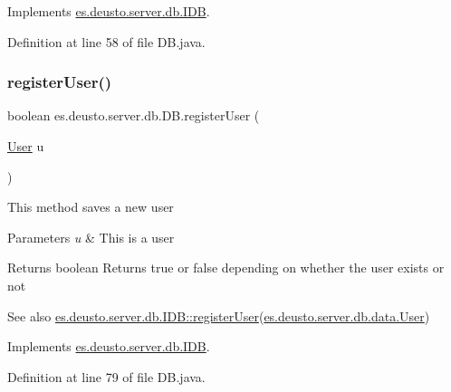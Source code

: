 Implements \hyperlink{interfacees_1_1deusto_1_1server_1_1db_1_1_i_d_b_a6e6196e5899fc93134223373ed8363a6}{es.\+deusto.\+server.\+db.\+I\+DB}.



Definition at line 58 of file D\+B.\+java.

\mbox{\label{classes_1_1deusto_1_1server_1_1db_1_1_d_b_a888f468b3fc2a05520fca9ac135823e3}} 
\subsubsection{\texorpdfstring{register\+User()}{registerUser()}}
{\footnotesize\ttfamily boolean es.\+deusto.\+server.\+db.\+D\+B.\+register\+User (\begin{DoxyParamCaption}\item[{\hyperlink{classes_1_1deusto_1_1server_1_1db_1_1data_1_1_user}{User}}]{u }\end{DoxyParamCaption})}

This method saves a new user 
\begin{DoxyParams}{Parameters}
{\em u} & This is a user \\
\hline
\end{DoxyParams}
\begin{DoxyReturn}{Returns}
boolean Returns true or false depending on whether the user exists or not 
\end{DoxyReturn}
\begin{DoxySeeAlso}{See also}
\hyperlink{interfacees_1_1deusto_1_1server_1_1db_1_1_i_d_b_ad9ecf628cb97ade7cb1b10fd1b3a18c4}{es.\+deusto.\+server.\+db.\+I\+D\+B\+::register\+User}(\hyperlink{classes_1_1deusto_1_1server_1_1db_1_1data_1_1_user}{es.\+deusto.\+server.\+db.\+data.\+User}) 
\end{DoxySeeAlso}


Implements \hyperlink{interfacees_1_1deusto_1_1server_1_1db_1_1_i_d_b_ad9ecf628cb97ade7cb1b10fd1b3a18c4}{es.\+deusto.\+server.\+db.\+I\+DB}.



Definition at line 79 of file D\+B.\+java.

\mbox{\label{classes_1_1deusto_1_1server_1_1db_1_1_d_b_ab5edf3ae158bb0501a882b1d724cc2a8}} 
